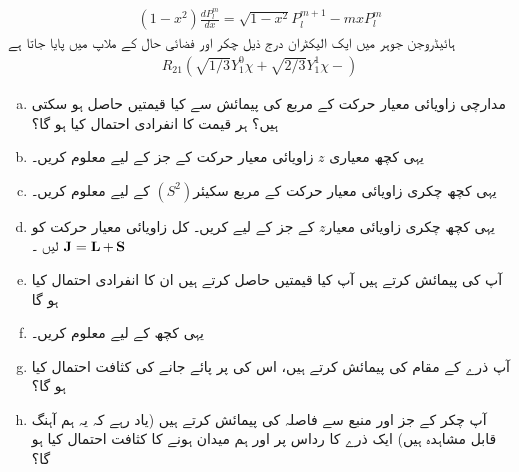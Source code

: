 \begin{align}
    (1-x^{2})\frac{ d P_{l}^{m}} {dx}=\sqrt{1-x^{2}}  P_{l}^{m+1}-mxP_{l}^{m}
\end{align}
ہائیڈروجن جوہر میں ایک الیکٹران درج ذیل چکر اور فضائی حال کے ملاپ میں پایا جاتا ہے 
\begin{align*}
    R_{21}(\sqrt{1/3}Y_{1}^{0}\chi + \sqrt{2/3}Y_{1}^{1}\chi-)
\end{align*} 
\begin{enumerate}[a.]
\item مدارچی زاویائی معیار حرکت کے مربع  کی پیمائش سے کیا قیمتیں حاصل ہو سکتی ہیں؟ ہر قیمت کا انفرادی احتمال کیا ہو گا؟ 
\item یہی کچھ معیاری \(z\) زاویائی معیار حرکت کے  جز کے لیے معلوم کریں۔
\item یہی کچھ چکری زاویائی معیار حرکت کے مربع سکیئر\((S^2)\) کے لیے معلوم کریں۔
\item یہی کچھ چکری زاویائی معیار\(z\) کے  جز کے لیے کریں۔ کل زاویائی معیار حرکت کو \(\operatorname{\mathbf{J}}=\operatorname{\mathbf{L}}+\operatorname{\mathbf{S}}\) لیں ۔
\item آپ  کی پیمائش کرتے ہیں آپ کیا قیمتیں حاصل کرتے ہیں ان کا انفرادی احتمال کیا ہو گا
\item یہی کچھ  کے لیے معلوم کریں۔
\item  آپ ذرے کے مقام کی پیمائش کرتے ہیں، اس کی   پر پائے جانے کی کثافت احتمال کیا ہو گا؟ 
\item آپ چکر کے  جز اور منبع سے فاصلہ کی پیمائش کرتے ہیں (یاد رہے کہ یہ ہم آہنگ قابل مشاہدہ  ہیں) ایک ذرے کا رداس   پر اور ہم میدان ہونے کا کثافت احتمال کیا ہو گا؟ 
\end{enumerate}
